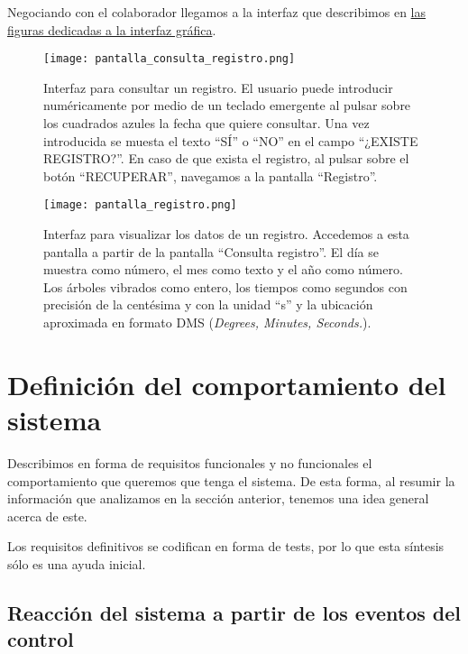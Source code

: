 Negociando con el colaborador llegamos a la interfaz que describimos
en \hyperref[fig:interfaz_grafica]{las figuras dedicadas a la interfaz
gráfica}.

\begin{figure}[!b]
    \begin{minipage}[b]{0.48\textwidth}
        \texttt{[image: pantalla\_consulta\_registro.png]}
        \caption{Interfaz para consultar un registro. El usuario puede
        introducir numéricamente por medio de un teclado emergente al pulsar
        sobre los cuadrados azules la fecha que quiere consultar. Una vez
        introducida se muesta el texto ``SÍ'' o ``NO'' en el campo ``¿EXISTE REGISTRO?''.
        En caso de que exista el registro, al pulsar sobre el botón ``RECUPERAR'',
        navegamos a la pantalla ``Registro''.}
    \end{minipage}
    \hfill
    \begin{minipage}[b]{0.48\textwidth}
        \texttt{[image: pantalla\_registro.png]}
        \caption{Interfaz para visualizar los datos de un registro. Accedemos
        a esta pantalla a partir de la pantalla ``Consulta registro''. El día
        se muestra como número, el mes como texto y el año como número.
        Los árboles vibrados como entero, los tiempos como segundos con 
        precisión de la centésima y con la unidad ``s'' y la ubicación
        aproximada en formato DMS (\textit{\textit{Degrees, Minutes, Seconds.}}).}
    \end{minipage}
    \label{fig:interfaz_grafica}
\end{figure}

\section{Definición del comportamiento del sistema}

Describimos en forma de requisitos funcionales y no funcionales el
comportamiento que queremos que tenga el sistema. De esta forma, al resumir
la información que analizamos en la sección anterior, tenemos una
idea general acerca de este.

Los requisitos definitivos se codifican en forma de tests, por lo que
esta síntesis sólo es una ayuda inicial.

\subsection{Reacción del sistema a partir de los eventos del control}


